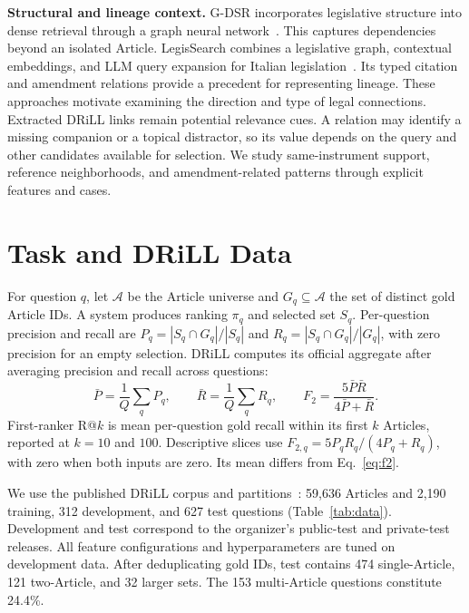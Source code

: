 \documentclass[runningheads,a4paper]{llncs}
\begin{document}
\noindent\textbf{Structural and lineage context.}
G-DSR incorporates legislative structure into dense retrieval through a graph neural network~\cite{louis2023finding}. This captures dependencies beyond an isolated Article. LegisSearch combines a legislative graph, contextual embeddings, and LLM query expansion for Italian legislation~\cite{colombo2025legissearch}. Its typed citation and amendment relations provide a precedent for representing lineage. These approaches motivate examining the direction and type of legal connections. Extracted DRiLL links remain potential relevance cues. A relation may identify a missing companion or a topical distractor, so its value depends on the query and other candidates available for selection. We study same-instrument support, reference neighborhoods, and amendment-related patterns through explicit features and cases.

\section{Task and DRiLL Data}
For question $q$, let $\mathcal A$ be the Article universe and $G_q\subseteq\mathcal A$ the set of distinct gold Article IDs. A system produces ranking $\pi_q$ and selected set $S_q$. Per-question precision and recall are $P_q=|S_q\cap G_q|/|S_q|$ and $R_q=|S_q\cap G_q|/|G_q|$, with zero precision for an empty selection. DRiLL computes its official aggregate after averaging precision and recall across questions:
\begin{equation}
 \bar P=\frac1Q\sum_qP_q,\qquad \bar R=\frac1Q\sum_qR_q,\qquad F_2=\frac{5\bar P\bar R}{4\bar P+\bar R}.
 \label{eq:f2}
\end{equation}
First-ranker R@$k$ is mean per-question gold recall within its first $k$ Articles, reported at $k=10$ and $100$. Descriptive slices use $F_{2,q}=5P_qR_q/(4P_q+R_q)$, with zero when both inputs are zero. Its mean differs from Eq.~\eqref{eq:f2}.

We use the published DRiLL corpus and partitions~\cite{vuong2025drill}: 59,636 Articles and 2,190 training, 312 development, and 627 test questions (Table~\ref{tab:data}). Development and test correspond to the organizer's public-test and private-test releases. All feature configurations and hyperparameters are tuned on development data. After deduplicating gold IDs, test contains 474 single-Article, 121 two-Article, and 32 larger sets. The 153 multi-Article questions constitute 24.4\%.
\end{document}

